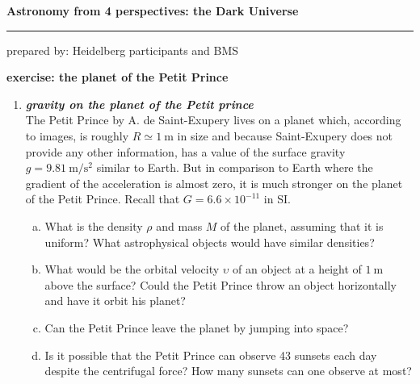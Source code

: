 \documentclass[a4paper,12pt]{article}
\newcommand{\question}[1]{\textbf{\textit{#1}}}
\newcommand{\HRule}{\rule{\linewidth}{0.3mm}}
\begin{document}
\pagestyle{empty}

\begin{center}
\LARGE \textbf{Astronomy from 4 perspectives: the Dark Universe}
\HRule
\end{center}
\begin{flushright}
prepared by: Heidelberg participants and BMS
\end{flushright}
\begin{center}
{\Large \textbf{exercise: the planet of the Petit Prince}}
\end{center}
\vspace{5mm}

\begin{enumerate}

\item \question{gravity on the planet of the Petit prince}\\
The Petit Prince by A. de Saint-Exupery lives on a planet which,
according to images, is roughly $R\simeq 1~\mathrm{m}$ in size and
because Saint-Exupery does not provide any other information, has a
value of the surface gravity $g=9.81~\mathrm{m}/\mathrm{s}^2$ similar
to Earth. But in comparison to Earth where the gradient of the
acceleration is almost zero, it is much stronger on the planet of the
Petit Prince. Recall that $G=6.6\times 10^{-11}$ in SI.
\begin{enumerate}[(a)]
\item{What is the density $\rho$ and mass $M$ of the planet, assuming that it is uniform? What astrophysical objects would have similar densities?}
\item{What would be the orbital velocity $\upsilon$ of an object at a height of $1~\mathrm{m}$ above the surface? Could the Petit Prince throw an object horizontally and have it orbit his planet?}
\item{Can the Petit Prince leave the planet by jumping into space?}
\item{Is it possible that the Petit Prince can observe 43 sunsets each day despite the centrifugal force? How many sunsets can one observe at most?}
\end{enumerate}


\end{enumerate}
\end{document}
